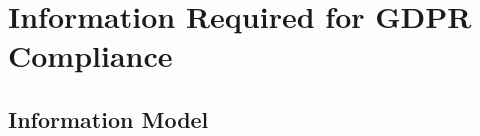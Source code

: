 \chapter{Information Required for GDPR Compliance}
\label{chapter:information}

\section{Information Model}\label{sec:information-model}